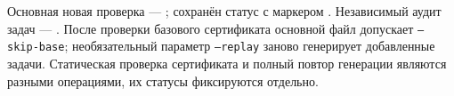 Основная новая проверка --- ; сохранён статус  с маркером . Независимый аудит задач --- . После проверки базового сертификата основной файл допускает \texttt{--skip-base}; необязательный параметр \texttt{--replay} заново генерирует добавленные задачи. Статическая проверка сертификата и полный повтор генерации являются разными операциями, их статусы фиксируются отдельно.
